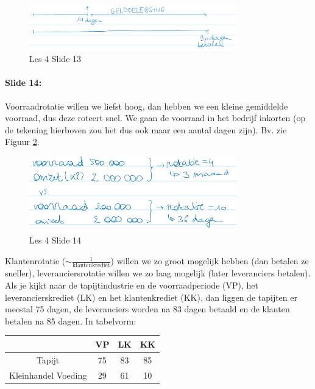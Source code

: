 \documentclass[10pt,a4paper]{report}
\begin{document}
\begin{figure}[h!]
\centering
\includegraphics[width=90mm]{Les04_01.png}
\caption{Les 4 Slide 13} 
\label{les04_01}
\end{figure}

\paragraph{Slide 14:} Voorraadrotatie willen we liefst hoog, dan hebben we een kleine gemiddelde voorraad, dus deze roteert snel. We gaan de voorraad in het bedrijf inkorten (op de tekening hierboven zou het dus ook maar een aantal dagen zijn). Bv. zie Figuur \ref{les04_02}.

\begin{figure}[h!]
\centering
\includegraphics[width=90mm]{Les04_02.png}
\caption{Les 4 Slide 14} 
\label{les04_02}
\end{figure}

Klantenrotatie ($\sim \frac{1}{\text{klantenkrediet}}$) willen we zo groot mogelijk hebben (dan betalen ze sneller), leveranciersrotatie willen we zo laag mogelijk (later leveranciers betalen). \\
Als je kijkt naar de tapijtindustrie en de voorraadperiode (VP),  het leverancierskrediet (LK) en het klantenkrediet (KK), dan liggen de tapijten er meestal 75 dagen, de leveranciers worden na 83 dagen betaald en de klanten betalen na 85 dagen. In tabelvorm:


\begin{table}[h!]
\centering
\begin{tabular}{|c||c|c|c|}
\hline                         										
		 				&	VP 		&	LK		&	KK		\\	\hline	\hline
Tapijt					&	75		&	83		&	85		\\	\hline
Kleinhandel Voeding		&	29		&	61		&	10		\\	\hline

\end{tabular}
\label{les4_slide14}
\end{table}
\end{document}
